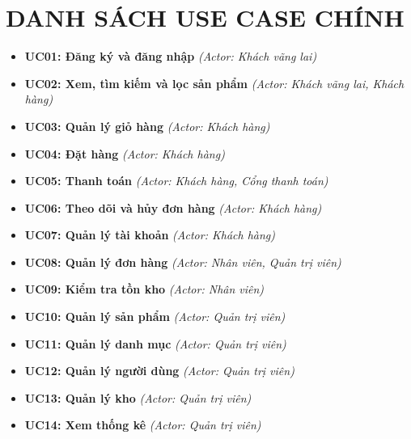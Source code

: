 \documentclass[12pt,a4paper]{article}
\begin{document}
\section{DANH SÁCH USE CASE CHÍNH}

\begin{itemize}

    \item \textbf{UC01: Đăng ký và đăng nhập} \textit{(Actor: Khách vãng lai)}

    \item \textbf{UC02: Xem, tìm kiếm và lọc sản phẩm} \textit{(Actor: Khách vãng lai, Khách hàng)}

    \item \textbf{UC03: Quản lý giỏ hàng} \textit{(Actor: Khách hàng)}

    \item \textbf{UC04: Đặt hàng} \textit{(Actor: Khách hàng)}

    \item \textbf{UC05: Thanh toán} \textit{(Actor: Khách hàng, Cổng thanh toán)}

    \item \textbf{UC06: Theo dõi và hủy đơn hàng} \textit{(Actor: Khách hàng)}

    \item \textbf{UC07: Quản lý tài khoản} \textit{(Actor: Khách hàng)}

    \item \textbf{UC08: Quản lý đơn hàng} \textit{(Actor: Nhân viên, Quản trị viên)}

    \item \textbf{UC09: Kiểm tra tồn kho} \textit{(Actor: Nhân viên)}

    \item \textbf{UC10: Quản lý sản phẩm} \textit{(Actor: Quản trị viên)}

    \item \textbf{UC11: Quản lý danh mục} \textit{(Actor: Quản trị viên)}

    \item \textbf{UC12: Quản lý người dùng} \textit{(Actor: Quản trị viên)}

    \item \textbf{UC13: Quản lý kho} \textit{(Actor: Quản trị viên)}

    \item \textbf{UC14: Xem thống kê} \textit{(Actor: Quản trị viên)}

\end{itemize}
\end{document}
